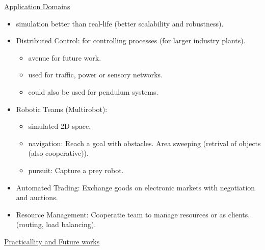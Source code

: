 \underline{Application Domains}
\begin{itemize}[noitemsep,nolistsep]
	\item simulation better than real-life (better scalability and robustness).
	\item Distributed Control: for controlling processes (for larger industry plants).
	\begin{itemize}[noitemsep,nolistsep]
		\item avenue for future work.
		\item used for traffic, power or sensory networks.
		\item could also be used for pendulum systems.
	\end{itemize}
	\item Robotic Teams (Multirobot):
	\begin{itemize}[noitemsep,nolistsep]
		\item simulated 2D space. 
		\item navigation: Reach a goal with obstacles. Area sweeping (retrival of objects (also cooperative)).
		\item pursuit: Capture a prey robot.
	\end{itemize}
	\item Automated Trading: Exchange goods on electronic markets with negotiation and auctions.
	\item Resource Management: Cooperatie team to manage resources or as clients. (routing, load balancing).
\end{itemize}
\underline{Practicallity and Future works}
